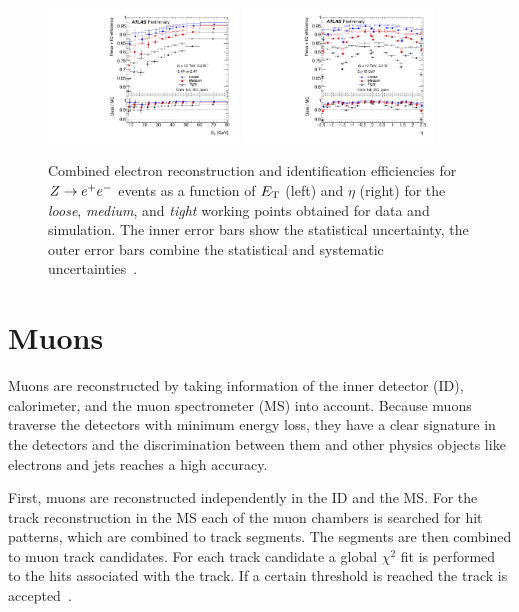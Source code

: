 \begin{figure}
    \centering
    \includegraphics[width=0.45\textwidth]{./figures/object_selection/electron_efficiency_et.pdf}
    \includegraphics[width=0.45\textwidth]{./figures/object_selection/electron_efficiency_eta.pdf}
    \caption{Combined electron reconstruction and identification efficiencies for $Z \to e^+e^-$ events as a
             function of $E_\text{T}$ (left) and $\eta$ (right) for the \emph{loose}, \emph{medium}, and \emph{tight}
             working points obtained for data and simulation. The inner error bars show the statistical uncertainty, the outer error bars combine
             the statistical and systematic uncertainties~\cite{ATLAS-CONF-2016-024}.}\label{fig:object_selection:el_id_eff}
\end{figure}

\section{Muons}\label{sec:object_selection:muons}

Muons are reconstructed by taking information of the inner detector (ID), calorimeter, and the
muon spectrometer (MS) into account.
Because  muons traverse the detectors with minimum energy loss, they have a clear signature in the detectors and the
discrimination between them and other physics objects like electrons and jets reaches a high accuracy.

First, muons are reconstructed independently in the ID and the MS\@.
For the track reconstruction in the MS each of the muon chambers is searched for hit patterns, which are combined to track
segments. The segments are then combined to muon track candidates. For each track candidate a global $\chi^2$ fit
is performed to the hits associated with the track. If a certain threshold is reached the track is accepted~\cite{PERF-2015-10}.

